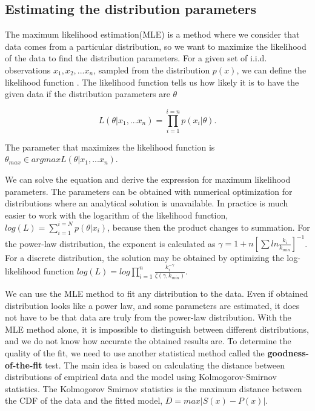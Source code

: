 \subsection{Estimating the distribution parameters}

The maximum likelihood estimation(MLE) is a method where we consider that data comes from a particular distribution, so we want to maximize the likelihood of the data to find the distribution parameters. For a given set of i.i.d. observations $x_1, x_2, ...x_n$, sampled from the distribution $p(x)$, we can define the likelihood function  \cite{nair2022fundamentals}. The likelihood function tells us how likely it is to have the given data if the distribution parameters are $\theta$

\begin{equation}
L (\theta| x_1, ... x_n) = \prod_{i=1}^{i=n} p(x_i | \theta).
\end{equation}

The parameter that maximizes the likelihood function is $\theta_{max} \in arg max L(\theta| x_1,... x_n)$.

We can solve the equation and derive the expression for maximum likelihood parameters. The parameters can be obtained with numerical optimization for distributions where an analytical solution is unavailable. In practice is much easier to work with the logarithm of the likelihood function, $log(L) = \sum_{i=1}^{i=N} p(\theta| x_i)$, because then the product changes to summation. For the power-law distribution, the exponent is calculated as  
$\gamma = 1+n[\sum ln \frac{k_i}{k_{min}} ]^{-1}$. For a discrete distribution, the solution may be obtained by optimizing the log-likelihood function $log(L) = log\prod_{i=1}^{n} \frac{k_i^{-\gamma}}{\zeta(\gamma, k_{min})}$.

We can use the MLE \cite{clauset2009power} method to fit any distribution to the data. Even if obtained distribution looks like a power law, and some parameters are estimated, it does not have to be that data are truly from the power-law distribution. With the MLE method alone, it is impossible to distinguish between different distributions, and we do not know how accurate the obtained results are. To determine the quality of the fit, we need to use another statistical method called the \textbf{goodness-of-the-fit} test. The main idea is based on calculating the distance between distributions of empirical data and the model using Kolmogorov-Smirnov statistics. The Kolmogorov Smirnov statistics is the maximum distance between the CDF of the data and the fitted model, $D = max |S(x) - P(x)|$.


